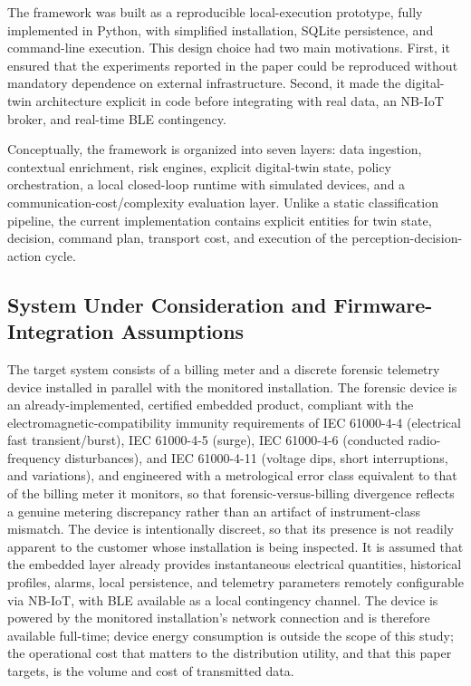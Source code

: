 \documentclass{ieeeaccess}
\begin{document}
The framework was built as a reproducible local-execution prototype, fully implemented in Python, with simplified installation, SQLite persistence, and command-line execution. This design choice had two main motivations. First, it ensured that the experiments reported in the paper could be reproduced without mandatory dependence on external infrastructure. Second, it made the digital-twin architecture explicit in code before integrating with real data, an NB-IoT broker, and real-time BLE contingency.

Conceptually, the framework is organized into seven layers: data ingestion, contextual enrichment, risk engines, explicit digital-twin state, policy orchestration, a local closed-loop runtime with simulated devices, and a communication-cost/complexity evaluation layer. Unlike a static classification pipeline, the current implementation contains explicit entities for twin state, decision, command plan, transport cost, and execution of the perception-decision-action cycle.

\subsection{System Under Consideration and Firmware-Integration Assumptions}
\label{subsec:System_Under_Consideratio}
The target system consists of a billing meter and a discrete forensic telemetry device installed in parallel with the monitored installation. The forensic device is an already-implemented, certified embedded product, compliant with the electromagnetic-compatibility immunity requirements of IEC 61000-4-4 (electrical fast transient/burst), IEC 61000-4-5 (surge), IEC 61000-4-6 (conducted radio-frequency disturbances), and IEC 61000-4-11 (voltage dips, short interruptions, and variations), and engineered with a metrological error class equivalent to that of the billing meter it monitors, so that forensic-versus-billing divergence reflects a genuine metering discrepancy rather than an artifact of instrument-class mismatch. The device is intentionally discreet, so that its presence is not readily apparent to the customer whose installation is being inspected. It is assumed that the embedded layer already provides instantaneous electrical quantities, historical profiles, alarms, local persistence, and telemetry parameters remotely configurable via NB-IoT, with BLE available as a local contingency channel. The device is powered by the monitored installation's network connection and is therefore available full-time; device energy consumption is outside the scope of this study; the operational cost that matters to the distribution utility, and that this paper targets, is the volume and cost of transmitted data.
\end{document}

